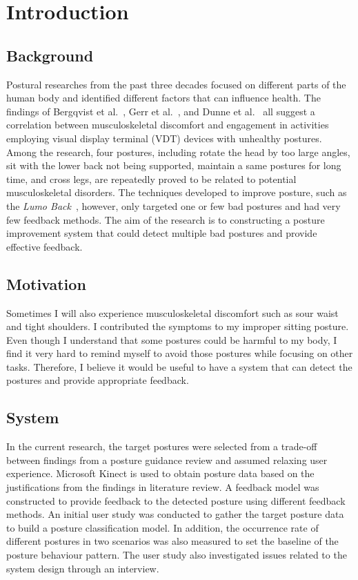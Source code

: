 \chapter{Introduction}

\section{Background}

Postural researches from the past three decades focused on different parts of the human body and identified different factors that can influence health. The findings of Bergqvist et al.~\cite{vdt_on_musculo_disorder}, Gerr et al.~\cite{epid_musculo_disorder}, and Dunne et al.~\cite{wearable_spinal_posture} all suggest a correlation between musculoskeletal discomfort and engagement in activities employing visual display terminal (VDT) devices with unhealthy postures. Among the research, four postures, including rotate the head by too large angles, sit with the lower back not being supported, maintain a same postures for long time, and cross legs, are repeatedly proved to be related to potential musculoskeletal disorders. The techniques developed to improve posture, such as the \textit{Lumo Back}~\cite{wearable_spinal_posture}, however, only targeted one or few bad postures and had very few feedback methods. The aim of the research is to constructing a posture improvement system that could detect multiple bad postures and provide effective feedback.

\section{Motivation}
Sometimes I will also experience musculoskeletal discomfort such as sour waist and tight shoulders. I contributed the symptoms to my improper sitting posture. Even though I understand that some postures could be harmful to my body, I find it very hard to remind myself to avoid those postures while focusing on other tasks. Therefore, I believe it would be useful to have a system that can detect the postures and provide appropriate feedback.

\section{System}
In the current research, the target postures were selected from a trade-off between findings from a posture guidance review and assumed relaxing user experience. Microsoft Kinect is used to obtain posture data based on the justifications from the findings in literature review. A feedback model was constructed to provide feedback to the detected posture using different feedback methods. An initial user study was conducted to gather the target posture data to build a posture classification model. In addition, the occurrence rate of different postures in two scenarios was also measured to set the baseline of the posture behaviour pattern. The user study also investigated issues related to the system design through an interview.

